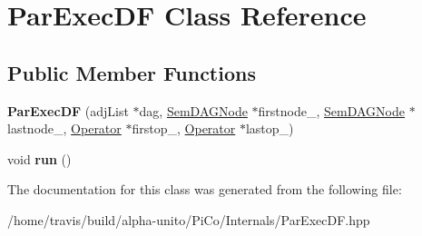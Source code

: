 \hypertarget{class_par_exec_d_f}{\section{\-Par\-Exec\-D\-F \-Class \-Reference}
\label{class_par_exec_d_f}
}
\subsection*{\-Public \-Member \-Functions}
\begin{DoxyCompactItemize}
\item 
\hypertarget{class_par_exec_d_f_aef7a4078b19e981b0f6d0654509e2f24}{{\bfseries \-Par\-Exec\-D\-F} (adj\-List $\ast$dag, \hyperlink{class_sem_d_a_g_node}{\-Sem\-D\-A\-G\-Node} $\ast$firstnode\-\_\-, \hyperlink{class_sem_d_a_g_node}{\-Sem\-D\-A\-G\-Node} $\ast$lastnode\-\_\-, \hyperlink{class_operator}{\-Operator} $\ast$firstop\-\_\-, \hyperlink{class_operator}{\-Operator} $\ast$lastop\-\_\-)}\label{class_par_exec_d_f_aef7a4078b19e981b0f6d0654509e2f24}

\item 
\hypertarget{class_par_exec_d_f_a5afb1f6732c4c84461a938b7d13fdf49}{void {\bfseries run} ()}\label{class_par_exec_d_f_a5afb1f6732c4c84461a938b7d13fdf49}

\end{DoxyCompactItemize}


\-The documentation for this class was generated from the following file\-:\begin{DoxyCompactItemize}
\item 
/home/travis/build/alpha-\/unito/\-Pi\-Co/\-Internals/\-Par\-Exec\-D\-F.\-hpp\end{DoxyCompactItemize}
